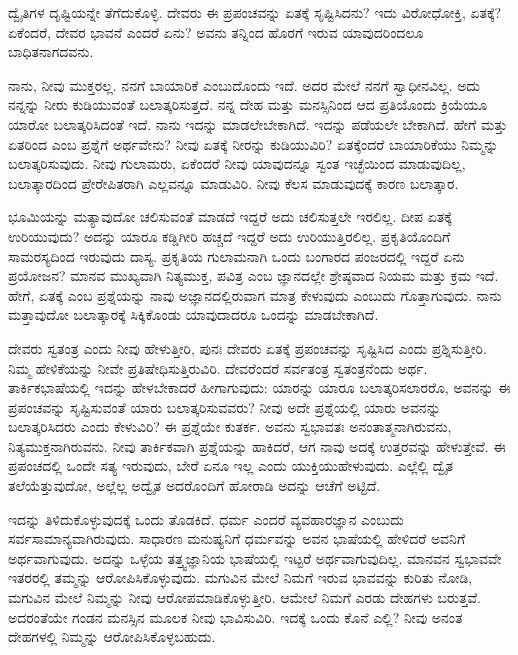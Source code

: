 ದ್ವೈತಿಗಳ ದೃಷ್ಟಿಯನ್ನೇ ತೆಗೆದುಕೊಳ್ಳಿ. ದೇವರು ಈ ಪ್ರಪಂಚವನ್ನು ಏತಕ್ಕೆ ಸೃಷ್ಟಿಸಿದನು? ಇದು ವಿರೋಧೋಕ್ತಿ, ಏತಕ್ಕೆ? ಏಕೆಂದರೆ, ದೇವರ ಭಾವನೆ ಎಂದರೆ ಏನು? ಅವನು ತನ್ನಿಂದ ಹೊರಗೆ ಇರುವ ಯಾವುದರಿಂದಲೂ ಬಾಧಿತನಾಗದವನು.

ನಾನು, ನೀವು ಮುಕ್ತರಲ್ಲ. ನನಗೆ ಬಾಯಾರಿಕೆ ಎಂಬುದೊಂದು ಇದೆ. ಅದರ ಮೇಲೆ ನನಗೆ ಸ್ವಾಧೀನವಿಲ್ಲ. ಅದು ನನ್ನನ್ನು ನೀರು ಕುಡಿಯುವಂತೆ ಬಲಾತ್ಕರಿಸುತ್ತದೆ. ನನ್ನ ದೇಹ ಮತ್ತು ಮನಸ್ಸಿನಿಂದ ಆದ ಪ್ರತಿಯೊಂದು ಕ್ರಿಯೆಯೂ ಯಾರೋ ಬಲಾತ್ಕರಿಸಿದಂತೆ ಇದೆ. ನಾನು ಇದನ್ನು ಮಾಡಲೇಬೇಕಾಗಿದೆ. ಇದನ್ನು ಪಡೆಯಲೇ ಬೇಕಾಗಿದೆ. ಹೇಗೆ ಮತ್ತು ಏತರಿಂದ ಎಂಬ ಪ್ರಶ್ನೆಗೆ ಅರ್ಥವೇನು? ನೀವು ಏತಕ್ಕೆ ನೀರನ್ನು ಕುಡಿಯುವಿರಿ? ಏತಕ್ಕೆಂದರೆ ಬಾಯಾರಿಕೆಯು ನಿಮ್ಮನ್ನು ಬಲಾತ್ಕರಿಸುವುದು. ನೀವು ಗುಲಾಮರು, ಏಕೆಂದರೆ ನೀವು ಯಾವುದನ್ನೂ ಸ್ವಂತ ಇಚ್ಛೆಯಿಂದ ಮಾಡುವುದಿಲ್ಲ, ಬಲಾತ್ಕಾರದಿಂದ ಪ್ರೇರೇಪಿತರಾಗಿ ಎಲ್ಲವನ್ನೂ ಮಾಡುವಿರಿ. ನೀವು ಕೆಲಸ ಮಾಡುವುದಕ್ಕೆ ಕಾರಣ ಬಲಾತ್ಕಾರ.

ಭೂಮಿಯನ್ನು ಮತ್ಯಾವುದೋ ಚಲಿಸುವಂತೆ ಮಾಡದೆ ಇದ್ದರೆ ಅದು ಚಲಿಸುತ್ತಲೇ ಇರಲಿಲ್ಲ. ದೀಪ ಏತಕ್ಕೆ ಉರಿಯುವುದು? ಅದನ್ನು ಯಾರೂ ಕಡ್ಡಿಗೀರಿ ಹಚ್ಚದೆ ಇದ್ದರೆ ಅದು ಉರಿಯುತ್ತಿರಲಿಲ್ಲ. ಪ್ರಕೃತಿಯೊಂದಿಗೆ ಸಾಮರಸ್ಯದಿಂದ ಇರುವುದು ದಾಸ್ಯ. ಪ್ರಕೃತಿಯ ಗುಲಾಮನಾಗಿ ಒಂದು ಬಂಗಾರದ ಪಂಜರದಲ್ಲಿ ಇದ್ದರೆ ಏನು ಪ್ರಯೋಜನ? ಮಾನವ ಮುಖ್ಯವಾಗಿ ನಿತ್ಯಮುಕ್ತ, ಪವಿತ್ರ ಎಂಬ ಜ್ಞಾನದಲ್ಲೇ ಶ್ರೇಷ್ಠವಾದ ನಿಯಮ ಮತ್ತು ಕ್ರಮ ಇದೆ. ಹೇಗೆ, ಏತಕ್ಕೆ ಎಂಬ ಪ್ರಶ್ನೆಯನ್ನು ನಾವು ಅಜ್ಞಾನದಲ್ಲಿರುವಾಗ ಮಾತ್ರ ಕೇಳುವುದು ಎಂಬುದು ಗೊತ್ತಾಗುವುದು. ನಾನು ಮತ್ತಾವುದೋ ಬಲಾತ್ಕಾರಕ್ಕೆ ಸಿಕ್ಕಿಕೊಂಡು ಯಾವುದಾದರೂ ಒಂದನ್ನು ಮಾಡಬೇಕಾಗಿದೆ.

ದೇವರು ಸ್ವತಂತ್ರ ಎಂದು ನೀವು ಹೇಳುತ್ತೀರಿ, ಪುನಃ ದೇವರು ಏತಕ್ಕೆ ಪ್ರಪಂಚವನ್ನು ಸೃಷ್ಟಿಸಿದ ಎಂದು ಪ್ರಶ್ನಿಸುತ್ತೀರಿ. ನಿಮ್ಮ ಹೇಳಿಕೆಯನ್ನು ನೀವೇ ಪ್ರತಿಷೇಧಿಸುತ್ತಿರುವಿರಿ. ದೇವರೆಂದರೆ ಸರ್ವತಂತ್ರ ಸ್ವತಂತ್ರನೆಂದು ಅರ್ಥ. ತಾರ್ಕಿಕಭಾಷೆಯಲ್ಲಿ ಇದನ್ನು ಹೇಳಬೇಕಾದರೆ ಹೀಗಾಗುವುದು: ಯಾರನ್ನು ಯಾರೂ ಬಲಾತ್ಕರಿಸಲಾರರೊ, ಅವನನ್ನು ಈ ಪ್ರಪಂಚವನ್ನು ಸೃಷ್ಟಿಸುವಂತೆ ಯಾರು ಬಲಾತ್ಕರಿಸುವವರು? ನೀವು ಅದೇ ಪ್ರಶ್ನೆಯಲ್ಲಿ ಯಾರು ಅವನನ್ನು ಬಲಾತ್ಕರಿಸಿದರು ಎಂದು ಕೇಳುವಿರಿ? ಈ ಪ್ರಶ್ನೆಯೇ ಕುತರ್ಕ. ಅವನು ಸ್ವಭಾವತಃ ಅನಂತಾತ್ಮನಾಗಿರುವನು, ನಿತ್ಯಮುಕ್ತನಾಗಿರುವನು. ನೀವು ತಾರ್ಕಿಕವಾಗಿ ಪ್ರಶ್ನೆಯನ್ನು ಹಾಕಿದರೆ, ಆಗ ನಾವು ಅದಕ್ಕೆ ಉತ್ತರವನ್ನು ಹೇಳುತ್ತೇವೆ. ಈ ಪ್ರಪಂಚದಲ್ಲಿ ಒಂದೇ ಸತ್ಯ ಇರುವುದು, ಬೇರೆ ಏನೂ ಇಲ್ಲ ಎಂದು ಯುಕ್ತಿಯು\break ಹೇಳುವುದು. ಎಲ್ಲೆಲ್ಲಿ ದ್ವೈತ ತಲೆಯೆತ್ತುವುದೋ, ಅಲ್ಲೆಲ್ಲ ಅದ್ವೈತ ಅದರೊಂದಿಗೆ ಹೋರಾಡಿ ಅದನ್ನು ಆಚೆಗೆ ಅಟ್ಟಿದೆ.

ಇದನ್ನು ತಿಳಿದುಕೊಳ್ಳುವುದಕ್ಕೆ ಒಂದು ತೊಡಕಿದೆ. ಧರ್ಮ ಎಂದರೆ ವ್ಯವಹಾರಜ್ಞಾನ ಎಂಬುದು ಸರ್ವಸಾಮಾನ್ಯವಾಗಿರುವುದು. ಸಾಧಾರಣ ಮನುಷ್ಯನಿಗೆ ಧರ್ಮವನ್ನು ಅವನ ಭಾಷೆಯಲ್ಲಿ ಹೇಳಿದರೆ ಅವನಿಗೆ ಅರ್ಥವಾಗುವುದು. ಅದನ್ನು ಒಳ್ಳೆಯ ತತ್ತ್ವಜ್ಞಾನಿಯ ಭಾಷೆಯಲ್ಲಿ ಇಟ್ಟರೆ ಅರ್ಥವಾಗುವುದಿಲ್ಲ. ಮಾನವನ ಸ್ವಭಾವವೇ ಇತರರಲ್ಲಿ ತಮ್ಮನ್ನು ಆರೋಪಿಸಿಕೊಳ್ಳುವುದು. ಮಗುವಿನ ಮೇಲೆ ನಿಮಗೆ ಇರುವ ಭಾವವನ್ನು ಕುರಿತು ನೋಡಿ, ಮಗುವಿನ ಮೇಲೆ ನಿಮ್ಮನ್ನು ನೀವು ಆರೋಪಮಾಡಿಕೊಳ್ಳುತ್ತೀರಿ. ಆಮೇಲೆ ನಿಮಗೆ ಎರಡು ದೇಹಗಳು ಬರುತ್ತವೆ. ಅದರಂತೆಯೇ ಗಂಡನ ಮನಸ್ಸಿನ ಮೂಲಕ ನೀವು ಭಾವಿಸುವಿರಿ. ಇದಕ್ಕೆ ಒಂದು ಕೊನೆ ಎಲ್ಲಿ? ನೀವು ಅನಂತ ದೇಹಗಳಲ್ಲಿ ನಿಮ್ಮನ್ನು ಆರೋಪಿಸಿಕೊಳ್ಳಬಹುದು.

